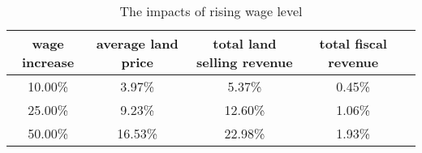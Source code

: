 \begin{table}[H]
\centering
\caption{The impacts of rising wage level}
\label{table: increase_wage}
\begin{tabular}{ccccc}
\toprule
wage increase & average land price & total land selling revenue & total fiscal revenue \\
\midrule
10.00\% & 3.97\% & 5.37\% & 0.45\% \\
25.00\% & 9.23\% & 12.60\% & 1.06\% \\
50.00\% & 16.53\% & 22.98\% & 1.93\% \\
\bottomrule
\end{tabular}
\end{table}
